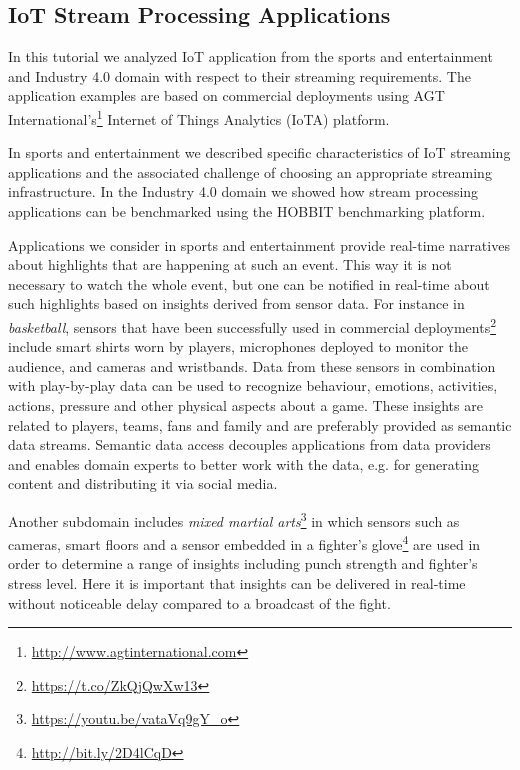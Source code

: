 \subsection{IoT Stream Processing Applications}
In this tutorial we analyzed IoT application from the sports and entertainment and Industry 4.0 domain with respect to their streaming requirements. The application examples are based on commercial deployments using AGT International's\footnote{\url{http://www.agtinternational.com}} Internet of Things Analytics (IoTA) platform. 

In sports and entertainment we described specific characteristics of IoT streaming applications and the associated challenge of choosing an appropriate streaming infrastructure. In the Industry 4.0 domain we showed how stream processing applications can be benchmarked using the HOBBIT benchmarking platform.

Applications we consider in sports and entertainment provide real-time narratives about highlights that are happening at such an event. This way it is not necessary to watch the whole event, but one can be notified in real-time about such highlights based on insights derived from sensor data. For instance in \emph{basketball}, sensors that have been successfully used in commercial deployments\footnote{\url{https://t.co/ZkQjQwXw13}} include smart shirts worn by players, microphones deployed to monitor the audience, and cameras and wristbands. Data from these sensors in combination with play-by-play data can be used to recognize behaviour, emotions, activities, actions, pressure and other physical aspects about a game. These insights are related to players, teams, fans and family and are preferably provided as semantic data streams. Semantic data access decouples applications from data providers and enables domain experts to better work with the data, e.g. for generating content and distributing it via social media. 

Another subdomain includes \emph{mixed martial arts}\footnote{\url{https://youtu.be/vataVq9gY_o}} in which sensors such as cameras, smart floors and a sensor embedded in a fighter's glove\footnote{\url{http://bit.ly/2D4lCqD}} are used in order to determine a range of insights including punch strength and fighter's stress level. Here it is important that insights can be delivered in real-time without noticeable delay compared to a broadcast of the fight.

